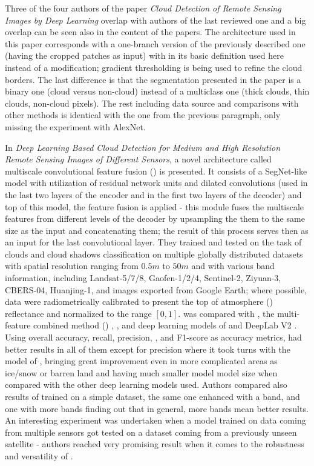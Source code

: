 Three of the four authors of the paper \textit{Cloud Detection of Remote Sensing Images by Deep Learning} overlap with authors of the last reviewed one and a big overlap can be seen also in the content of the papers. The architecture used in this paper corresponds with a one-branch version of the previously described one (having the cropped patches as input) with  in its basic definition used here instead of a modification; gradient thresholding is being used to refine the cloud borders. The last difference is that the segmentation presented in the paper is a binary one (cloud versus non-cloud) instead of a multiclass one (thick clouds, thin clouds, non-cloud pixels). The rest including data source and comparisons with other methods is identical with the one from the previous paragraph, only missing the experiment with AlexNet.

In \textit{Deep Learning Based Cloud Detection for Medium and High Resolution Remote Sensing Images of Different Sensors}, a novel architecture called multiscale convolutional feature fusion () is presented. It consists of a SegNet-like model \cite{segnet} with utilization of residual network units \cite{resnet} and dilated convolutions \cite{dilated-cnn} (used in the last two layers of the encoder and in the first two layers of the decoder) and top of this model, the feature fusion is applied - this module fuses the multiscale features from different levels of the decoder by upsampling the them to the same size as the input and concatenating them; the result of this process serves then as an input for the last convolutional layer. They trained and tested  on the task of clouds and cloud shadows classification on multiple globally distributed datasets with spatial resolution ranging from $0.5 m$ to $50 m$ and with various band information, including Landsat-5/7/8, Gaofen-1/2/4, Sentinel-2, Ziyuan-3, CBERS-04, Huanjing-1, and images exported from Google Earth; where possible, data were radiometrically calibrated to present the top of atmosphere () reflectance and normalized to the range $[0, 1]$.  was compared with  \cite{fmask}, the multi-feature combined method () \cite{gf-1-cloud-dataset},  \cite{cloud-detection-progressive-refinement}, and deep learning models of \cite{cloud-snow-cnn} and DeepLab V2 \cite{deeplab}. Using overall accuracy, recall, precision, , and F1-score as accuracy metrics,  had better results in all of them except for precision where it took turns with the model of \cite{cloud-snow-cnn}, bringing great improvement even in more complicated areas as ice/snow or barren land and having much smaller model model size when compared with the other deep learning models used. Authors compared also results of  trained on a simple  dataset, the same one enhanced with a  band, and one with more bands finding out that in general, more bands mean better results. An interesting experiment was undertaken when a model trained on data coming from multiple sensors got tested on a dataset coming from a previously unseen satellite - authors reached very promising result when it comes to the robustness and versatility of .

